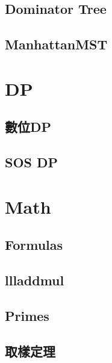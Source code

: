 \subsection{Dominator Tree}


\subsection{ManhattanMST}


\section{DP}

\subsection{數位DP}


\subsection{SOS DP}


\section{Math}

\subsection{Formulas}


\subsection{llladdmul}


\subsection{Primes}


\subsection{取樣定理}


